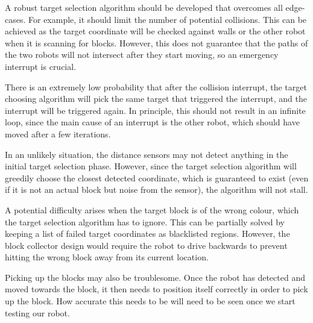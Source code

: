 
A robust target selection algorithm should be developed that overcomes all edge-cases. For example, it should limit the number of potential collisions. This can be achieved as the target coordinate will be checked against walls or the other robot when it is scanning for blocks. However, this does not guarantee that the paths of the two robots will not intersect after they start moving, so an emergency interrupt is crucial.

There is an extremely low probability that after the collision interrupt, the target choosing algorithm will pick the same target that triggered the interrupt, and the interrupt will be triggered again. In principle, this should not result in an infinite loop, since the main cause of an interrupt is the other robot, which should have moved after a few iterations.



In an unlikely situation, the distance sensors may not detect anything in the initial target selection phase. However, since the target selection algorithm will greedily choose the closest detected coordinate, which is guaranteed to exist (even if it is not an actual block but noise from the sensor), the algorithm will not stall.





A potential difficulty arises when the target block is of the wrong colour, which the target selection algorithm has to ignore. This can be partially solved by keeping a list of failed target coordinates as blacklisted regions. However, the block collector design would require the robot to drive backwards to prevent hitting the wrong block away from its current location.


Picking up the blocks may also be troublesome. Once the robot has detected and moved towards the block, it then needs to position itself correctly in order to pick up the block. How accurate this needs to be will need to be seen once we start testing our robot.




